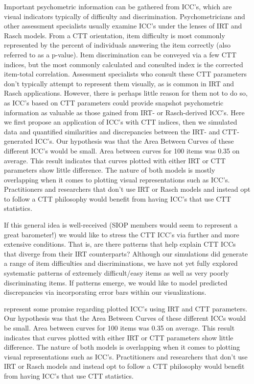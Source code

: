 \documentclass[
  man]{apa6}
\begin{document}
Important psychometric information can be gathered from ICC's, which are visual indicators typically of difficulty and discrimination. Psychometricians and other assessment specialists usually examine ICC's under the lenses of IRT and Rasch models. From a CTT orientation, item difficulty is most commonly represented by the percent of individuals answering the item correctly (also referred to as a p-value). Item discrimination can be conveyed via a few CTT indices, but the most commonly calculated and consulted index is the corrected item-total correlation. Assessment specialists who consult these CTT parameters don't typically attempt to represent them visually, as is common in IRT and Rasch applications. However, there is perhaps little reason for them not to do so, as ICC's based on CTT parameters could provide snapshot psychometric information as valuable as those gained from IRT- or Rasch-derived ICC's. Here we first propose an application of ICC's with CTT indices, then we simulated data and quantified similarities and discrepancies between the IRT- and CTT-generated ICC's. Our hypothesis was that the Area Between Curves of these different ICC's would be small. Area between curves for 100 items was 0.35 on average. This result indicates that curves plotted with either IRT or CTT parameters show little difference. The nature of both models is mostly overlapping when it comes to plotting visual representations such as ICC's. Practitioners and researchers that don't use IRT or Rasch models and instead opt to follow a CTT philosophy would benefit from having ICC's that use CTT statistics.

If this general idea is well-received (SIOP members would seem to represent a great barometer!) we would like to stress the CTT ICC's via further and more extensive conditions. That is, are there patterns that help explain CTT ICCs that diverge from their IRT counterparts? Although our simulations did generate a range of item difficulties and discriminations, we have not yet fully explored systematic patterns of extremely difficult/easy items as well as very poorly discriminating items. If patterns emerge, we would like to model predicted discrepancies via incorporating error bars within our visualizations.

represent some promise regarding plotted ICC's using IRT and CTT parameters. Our hypothesis was that the Area Between Curves of these different ICCs would be small. Area between curves for 100 items was 0.35 on average. This result indicates that curves plotted with either IRT or CTT parameters show little difference. The nature of both models is overlapping when it comes to plotting visual representations such as ICC's. Practitioners and researchers that don't use IRT or Rasch models and instead opt to follow a CTT philosophy would benefit from having ICC's that use CTT statistics.
\end{document}
